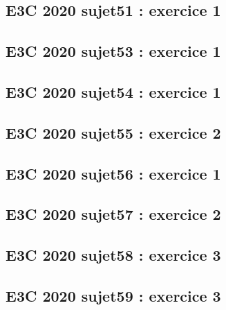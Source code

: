 \documentclass[lang=fr,edition=teacher,layout=sheet]{mxbook}
\begin{document}
\subsection*{E3C 2020 sujet51 : exercice 1}
\begingroup\endgroup
\par\bigskip
{}\subsection*{E3C 2020 sujet53 : exercice 1}
\begingroup\endgroup
\par\bigskip
{}\subsection*{E3C 2020 sujet54 : exercice 1}
\begingroup\endgroup
\par\bigskip
{}\subsection*{E3C 2020 sujet55 : exercice 2}
\begingroup\endgroup
\par\bigskip
{}\subsection*{E3C 2020 sujet56 : exercice 1}
\begingroup\endgroup
\par\bigskip
{}\subsection*{E3C 2020 sujet57 : exercice 2}
\begingroup\endgroup
\par\bigskip
{}\subsection*{E3C 2020 sujet58 : exercice 3}
\begingroup\endgroup
\par\bigskip
{}\subsection*{E3C 2020 sujet59 : exercice 3}
\end{document}
